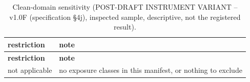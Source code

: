 \begingroup\footnotesize
\begin{longtable}{>{\raggedright\arraybackslash}p{126.4pt}>{\raggedright\arraybackslash}p{304.6pt}}
\caption{Clean-domain sensitivity (POST-DRAFT INSTRUMENT VARIANT -- v1.0F (specification §4j), inspected sample, descriptive, not the registered result).} \\
\toprule
\textbf{restriction} & \textbf{note} \\
\midrule
\endfirsthead
\toprule
\textbf{restriction} & \textbf{note} \\
\midrule
\endhead
\bottomrule
\endfoot
not applicable & no exposure classes in this manifest, or nothing to exclude \\
\end{longtable}
\endgroup

